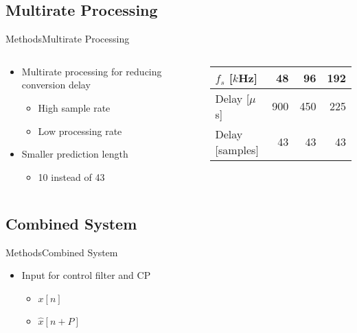 \subsection{Multirate Processing}
\begin{frame}{Methods}{Multirate Processing}	
\begin{columns}
	\begin{column}{0.5\textwidth}
		\begin{itemize}
			\item Multirate processing for reducing conversion delay
			\begin{itemize}
				\item High sample rate
				\item Low processing rate
			\end{itemize}
			\item Smaller prediction length
			\begin{itemize}
				\item 10 instead of 43
			\end{itemize}
		\end{itemize}
	\end{column}
	\begin{column}{0.5\textwidth} 
		\begin{table}[H]
			\centering
			\begin{tabular}{|l|r|r|r|}
				\hline
				$f_s$ {[}$k$Hz{]} & 48 & 96 & 192 \\ \hline
				Delay {[}$\mu$s{]} & 900 & 450 & 225 \\ \hline
				Delay {[}samples{]} & 43 & 43 & 43 \\ \hline
			\end{tabular}
		\end{table}
	\end{column}
\end{columns}
\end{frame}




\subsection{Combined System}
\begin{frame}{Methods}{Combined System}	
		\begin{itemize}
			\item Input for control filter and CP
			\begin{itemize}
			\item $x[n]$
			\item $\hat{x}[n+P]$
			\end{itemize}
		\end{itemize}
\begin{center}
	\resizebox{0.9\columnwidth}{!}{		
			}
\end{center}

\end{frame}





